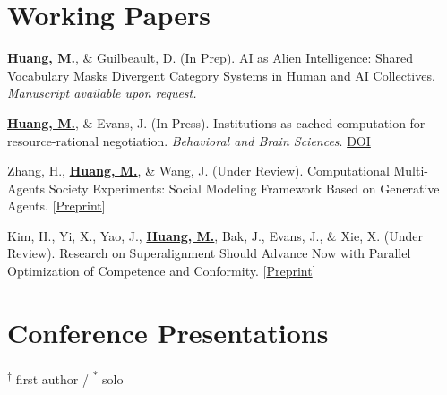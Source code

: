 \documentclass[11pt,letterpaper]{article}
\newcommand{\myname}[1]{\textbf{\uline{#1}}}
\begin{document}
\section*{Working Papers}

\begin{enumerate}[label={[\arabic*]}]
    \item \myname{Huang, M.}, \& Guilbeault, D. (In Prep). AI as Alien Intelligence: Shared Vocabulary Masks Divergent Category Systems in Human and AI Collectives. \textit{Manuscript available upon request.}

    \item \myname{Huang, M.}, \& Evans, J. (In Press). Institutions as cached computation for resource-rational negotiation. \textit{Behavioral and Brain Sciences}. \href{https://doi.org/10.1017/S0140525X2510174X}{DOI}

    \item Zhang, H., \myname{Huang, M.}, \& Wang, J. (Under Review). Computational Multi-Agents Society Experiments: Social Modeling Framework Based on Generative Agents. [\href{https://arxiv.org/abs/2508.17366}{Preprint}]

    \item Kim, H., Yi, X., Yao, J., \myname{Huang, M.}, Bak, J., Evans, J., \& Xie, X. (Under Review). Research on Superalignment Should Advance Now with Parallel Optimization of Competence and Conformity. [\href{https://arxiv.org/abs/2503.07660}{Preprint}]

\end{enumerate}

\section*{Conference Presentations}

\noindent\textsuperscript{$\dagger$} first author / \textsuperscript{*} solo
\end{document}
